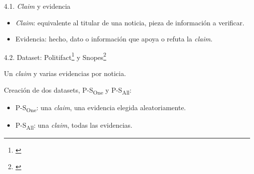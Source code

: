 \begin{frame}{4.1. \textit{Claim} y evidencia}
\begin{itemize}
    \item \textit{Claim}: equivalente al titular de una noticia, pieza de información a verificar.
    \item Evidencia: hecho, dato o información que apoya o refuta la \textit{claim}.
\end{itemize}
\end{frame}

\begin{frame}{4.2. Dataset: Politifact\footnote{\citep{Popat2017}} y Snopes\footnote{\citep{Vlachos2014}}}

Un \textit{claim} y varias evidencias por noticia. 

\vspace{0.5ex}

Creación de dos datasets, {P-S}\textsubscript{One} y {P-S}\textsubscript{All}:
\begin{itemize}
    \item {P-S}\textsubscript{One}: una \textit{claim}, una evidencia elegida aleatoriamente.
    \item {P-S}\textsubscript{All}: una \textit{claim}, todas las evidencias.
\end{itemize}





\vspace{2ex}


\end{frame}
